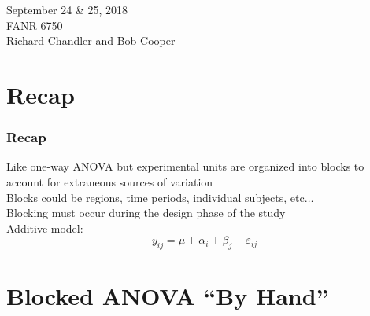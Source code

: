 \documentclass[color=usenames,dvipsnames]{beamer}\usepackage[]{graphicx}\usepackage[]{color}
\begin{document}




\begin{frame}[plain]
  \LARGE
  \centering \par
  {\color{RoyalBlue}{Lab 6 -- Randomized Complete Block Design \par}}
  \vspace{1cm}
  \large
  September 24 \& 25, 2018 \\
  FANR 6750 \\
  \vfill
  \large
  Richard Chandler and Bob Cooper
\end{frame}


\section{Recap}

\begin{frame}
  \frametitle{Recap}
  \large
  Like one-way ANOVA but experimental units are
  organized into blocks to account for extraneous sources of
  variation \\
      \pause
      \vfill
      Blocks could be regions, time periods, individual subjects,
      etc$\ldots$ \\
      \pause
      \vfill
      Blocking must occur during the design phase of the study \\
      \pause
      \vfill
      Additive model:
  \[
    y_{ij} = \mu + \alpha_i + \beta_j + \varepsilon_{ij}
  \]
\end{frame}


\section{Blocked ANOVA ``By Hand''}
\end{document}
